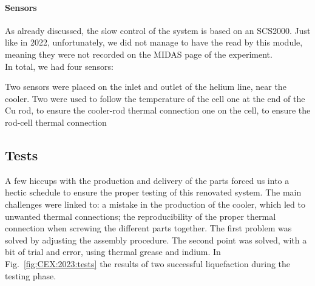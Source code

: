 \begin{refsection}
        \paragraph{Sensors} As already discussed, the slow control of the system is based on an SCS2000.
        Just like in 2022, unfortunately, we did not manage to have the \lakeshore read by this module, meaning they were not recorded on the MIDAS page of the experiment.\\
        In total, we had four \lakeshore sensors:
        \begin{outline}
            \1 Two sensors were placed on the inlet and outlet of the helium line, near the cooler.
            \1 Two were used to follow the temperature of the cell
                \2 one at the end of the Cu rod, to ensure the cooler-rod thermal connection
                \2 one on the cell, to ensure the rod-cell thermal connection 
        \end{outline}

    \subsection{Tests}
        A few hiccups with the production and delivery of the parts forced us into a hectic schedule to ensure the proper testing of this renovated system.
        The main challenges were linked to: a mistake in the production of the cooler, which led to unwanted thermal connections; the reproducibility of the proper thermal connection when screwing the different parts together.
        The first problem was solved by adjusting the assembly procedure. The second point was solved, with a bit of trial and error, using thermal grease and indium.
        In Fig.~\ref{fig:CEX:2023:tests} the results of two successful liquefaction during the testing phase.
        

\end{refsection}
